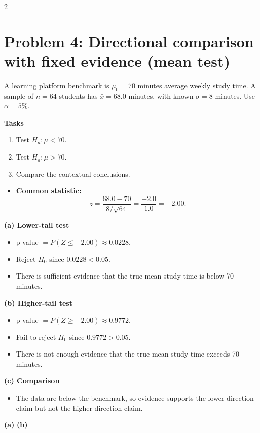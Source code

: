 \begin{multicols}{2}
\section{Problem 4: Directional comparison with fixed evidence (mean test)}
A learning platform benchmark is \(\mu_0=70\) minutes average weekly study time. A sample of \(n=64\) students has \(\bar x=68.0\) minutes, with known \(\sigma=8\) minutes. Use \(\alpha=5\%\).

\textbf{Tasks}
\begin{enumerate}
    \item[(a)] Test \(H_a:\mu<70\).
    \item[(b)] Test \(H_a:\mu>70\).
    \item[(c)] Compare the contextual conclusions.
\end{enumerate}

\begin{itemize}
    \item \textbf{Common statistic:}
    \[
    z=\frac{68.0-70}{8/\sqrt{64}}=\frac{-2.0}{1.0}=-2.00.
    \]
\end{itemize}

\textbf{(a) Lower-tail test}
\begin{itemize}
    \item p-value \(=P(Z\le-2.00)\approx0.0228\).
    \item Reject \(H_0\) since \(0.0228<0.05\).
    \item There is sufficient evidence that the true mean study time is below 70 minutes.
\end{itemize}

\textbf{(b) Higher-tail test}
\begin{itemize}
    \item p-value \(=P(Z\ge-2.00)\approx0.9772\).
    \item Fail to reject \(H_0\) since \(0.9772>0.05\).
    \item There is not enough evidence that the true mean study time exceeds 70 minutes.
\end{itemize}

\textbf{(c) Comparison}
\begin{itemize}
    \item The data are below the benchmark, so evidence supports the lower-direction claim but not the higher-direction claim.
\end{itemize}

\begin{center}
\textbf{(a)}\;
\hspace{0.8cm}
\textbf{(b)}\;
\end{center}


\end{multicols}
